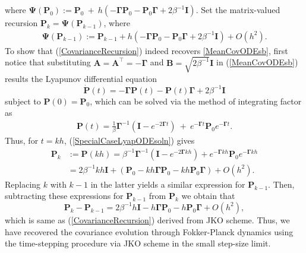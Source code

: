 \documentclass[letterpaper,10pt,twocolumn,conference]{ieeeconf}
\begin{document}
\hspace*{-.05in}where $\bm{\Psi}(\bm{P}_{0}):=\bm{P}_{0} \: + \: h\left(-\bm{\Gamma}\bm{P}_{0} - \bm{P}_{0}\bm{\Gamma} + \allowbreak 2\allowbreak\beta^{-1}\allowbreak\bm{I}\allowbreak\right)$.  Set the matrix-valued recursion $\bm{P}_{k}=\bm{\Psi}\left(\bm{P}_{k-1}\right)$, where
{\small{\begin{eqnarray}
\bm{\Psi}\left(\bm{P}_{k-1}\right) := \bm{P}_{k-1} + h\left(-\bm{\Gamma}\bm{P}_{0} - \bm{P}_{0}\bm{\Gamma} + 2\beta^{-1}\bm{I}\right) + O(h^{2}).
\label{CovarianceRecursion}
\end{eqnarray}}}
\hspace*{-.05in}To show that (\ref{CovarianceRecursion}) indeed recovers \eqref{MeanCovODEsb}, first notice that substituting $\bm{A} = \bm{A}^{\top} = -\bm{\Gamma}$ and $\bm{B}=\sqrt{2\beta^{-1}}\bm{I}$ in (\ref{MeanCovODEsb}) results the Lyapunov differential equation
\[
\dot{\bm{P}}(t)=-\bm{\Gamma}\bm{P}(t)-\bm{P}(t)\bm{\Gamma}+2\beta^{-1}\bm{I}
\]
subject to $\bm{P}(0)=\bm{P}_{0}$, which can be solved via the method of integrating factor as
\begin{eqnarray}
\bm{P}(t) = \frac{1}{\beta}\bm{\Gamma}^{-1}\left(\bm{I} - e^{-2\bm{\Gamma}t}\right) \: + \: e^{-\bm{\Gamma}t}\bm{P}_{0}e^{-\bm{\Gamma}t}.
\label{SpecialCaseLyapODEsoln}	
\end{eqnarray}
Thus, for $t=kh$, (\ref{SpecialCaseLyapODEsoln}) gives
\begin{align*}
\bm{P}_{k}&:=\bm{P}(kh)=\beta^{-1}\bm{\Gamma}^{-1}\left(\bm{I}-e^{-2\bm{\Gamma}kh}\right) + e^{-\bm{\Gamma}kh}\bm{P}_{0}e^{-\bm{\Gamma}kh}\\
&= 2\beta^{-1}kh\bm{I} + \left(\bm{P}_{0} - kh\bm{\Gamma}\bm{P}_{0} - kh\bm{P}_{0}\bm{\Gamma}\right) + O(h^{2}).
\end{align*}
Replacing $k$ with $k-1$ in the latter yields a similar expression for $\bm{P}_{k-1}$. Then, subtracting these expressions for $\bm{P}_{k-1}$ from $\bm{P}_{k}$ we obtain that 
\[
\bm{P}_{k}-\bm{P}_{k-1}=2\beta^{-1}h\bm{I} - h\bm{\Gamma}\bm{P}_{0} - h\bm{P}_{0}\bm{\Gamma} + O(h^{2}),
\]
 which is same as (\ref{CovarianceRecursion}) derived from JKO scheme. Thus, we have recovered the covariance evolution through Fokker-Planck dynamics using the time-stepping procedure via JKO scheme in the small step-size limit.
\end{document}
